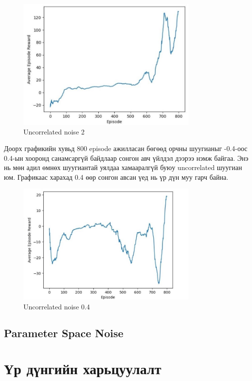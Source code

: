 \documentclass[12pt,A4]{report}
\begin{document}
\begin{figure}[H]
\centering
\includegraphics[width=0.8\textwidth]{./images/after_800_ep_02_am}
\caption{Uncorrelated noise 2}
\end{figure}

Доорх графикийн хувьд 800 episode ажилласан бөгөөд орчны шуугианыг -0.4-оос 0.4-ын хооронд санамсаргүй байдлаар сонгон авч үйлдэл дээрээ нэмж байгаа. Энэ нь мөн адил өмнөх шуугиантай уялдаа хамааралгүй буюу uncorrelated шуугиан юм. Графикаас харахад 0.4 өөр сонгон авсан үед нь үр дүн муу гарч байна.

\begin{figure}[H]
\centering
\includegraphics[width=0.8\textwidth]{./images/after_800_ep_04}
\caption{Uncorrelated noise 0.4}
\end{figure}

\subsection{Parameter Space Noise}

\section{Үр дүнгийн харьцуулалт}
\end{document}

